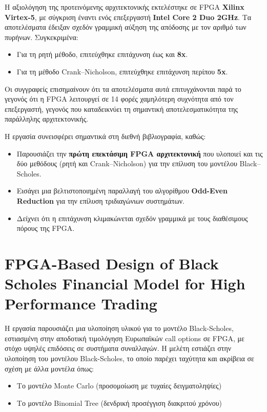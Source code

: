 Η αξιολόγηση της προτεινόμενης αρχιτεκτονικής εκτελέστηκε σε FPGA \textbf{Xilinx Virtex-5}, με σύγκριση έναντι ενός επεξεργαστή \textbf{Intel Core 2 Duo 2GHz}.
Τα αποτελέσματα έδειξαν σχεδόν γραμμική αύξηση της απόδοσης με τον αριθμό των πυρήνων. Συγκεκριμένα:
\begin{itemize}
  \item Για τη ρητή μέθοδο, επιτεύχθηκε επιτάχυνση έως και \textbf{8x}.
  \item Για τη μέθοδο Crank–Nicholson, επιτεύχθηκε επιτάχυνση περίπου \textbf{5x}.
\end{itemize}
Οι συγγραφείς επισημαίνουν ότι τα αποτελέσματα αυτά επιτυγχάνονται παρά το γεγονός ότι η FPGA λειτουργεί σε 14 φορές χαμηλότερη συχνότητα από τον επεξεργαστή, γεγονός που καταδεικνύει τη σημαντική αποτελεσματικότητα της παράλληλης αρχιτεκτονικής.

Η εργασία συνεισφέρει σημαντικά στη διεθνή βιβλιογραφία, καθώς:
\begin{itemize}
  \item Παρουσιάζει την \textbf{πρώτη επεκτάσιμη FPGA αρχιτεκτονική} που υλοποιεί και τις δύο μεθόδους (ρητή και Crank–Nicholson) για την επίλυση του μοντέλου Black–Scholes.
  \item Εισάγει μια βελτιστοποιημένη παραλλαγή του αλγορίθμου \textbf{Odd-Even Reduction} για την επίλυση τριδιαγώνιων συστημάτων.
  \item Δείχνει ότι η επιτάχυνση κλιμακώνεται σχεδόν γραμμικά με τους διαθέσιμους πόρους της FPGA.
\end{itemize}

\section{FPGA-Based Design of Black Scholes Financial Model for High Performance Trading}

Η εργασία \cite{fpga_black_scholes_choo} παρουσιάζει μια υλοποίηση υλικού για το μοντέλο Black-Scholes, εστιασμένη στην αποδοτική τιμολόγηση Ευρωπαϊκών call options σε FPGA, με στόχο υψηλές επιδόσεις σε συστήματα συναλλαγών.
Η μελέτη εστιάζει στην υλοποίηση του μοντέλου Black-Scholes, το οποίο παρέχει ταχύτητα και ακρίβεια σε σχέση με άλλα μοντέλα όπως:
\begin{itemize}
    \item Το μοντέλο Monte Carlo (προσομοίωση με τυχαίες δειγματοληψίες)
    \item Το μοντέλο Binomial Tree (δενδρική προσέγγιση διακριτού χρόνου)
\end{itemize}

